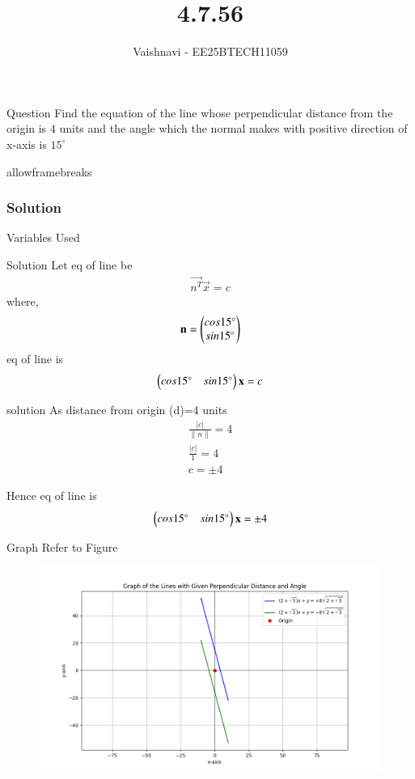 \documentclass{beamer}
\title %
{4.7.56}
\author %
{Vaishnavi - EE25BTECH11059}
\begin{document}
\frame{\titlepage}
\begin{frame}{Question}
Find the equation of the line whose perpendicular distance from the origin is $4$ units and the angle which the normal makes with positive direction of x-axis is $15^\circ$
\end{frame}
\begin{frame}{allowframebreaks}
\frametitle{Solution}
\begin{table}[H]    
  \centering
  
  \caption{Variables Used}
  \label{tab:1.10.2}
\end{table}

\end{frame}


\begin{frame}{Solution}
Let eq of line be
\begin{align}
\vec{n^T}\vec{x}=c
\end{align}
where,
\begin{align}
\mathbf{n}=\begin{pmatrix}cos 15^\circ
               \\
               sin 15^\circ\end{pmatrix}
\end{align}
eq of line is
\begin{align}
\begin{pmatrix}cos 15^\circ & sin 15^\circ\end{pmatrix}
\mathbf{x}
=c
\end{align}
\end{frame}

\begin{frame}{solution}
As distance from origin (d)=$4$ units
\begin{align}
    \frac{|c|}{\|n\|}=4\\
    \frac{|c|}{1}=4\\
    c=\pm 4
\end{align}   


Hence eq of line is 
\begin{align}
\begin{pmatrix}cos 15^\circ & sin 15^\circ\end{pmatrix}
\mathbf{x}
=\pm4
\end{align}

\end{frame}
\begin{frame}{Graph}
   Refer to Figure

\begin{figure}[H]
\begin{center}
\includegraphics[width=0.6\columnwidth]{../figs/graph7.png}
\end{center}
\caption{}
\label{fig:Fig}
\end{figure}  
\end{frame}
\end{document}
